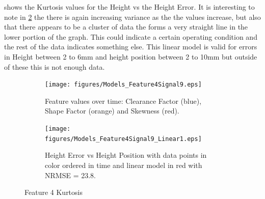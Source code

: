 \documentclass[]{article}
\begin{document}
 shows the Kurtosis values for the Height vs the Height Error. It is interesting to note in \cref{fig:Models_Feature4Signal9_Linear1} the there is again increasing variance as the the values increase, but also that there appears to be a cluster of data the forms a very straight line in the lower portion of the graph. This could indicate a certain operating condition and the rest of the data indicates something else. This linear model is valid for errors in Height between 2 to 6mm and height position between 2 to 10mm but outside of these this is not enough data.
\begin{figure}[H]
    \centering
	\begin{subfigure}[t]{.45\textwidth}
		\centering
		\texttt{[image: figures/Models\_Feature4Signal9.eps]}
		\caption{Feature values over time: Clearance Factor (blue), Shape Factor (orange) and Skewness (red).}
		\label{fig:Models_Feature4Signal9}
	\end{subfigure}
	\hspace*{\fill}%
	\begin{subfigure}[t]{.45\textwidth}
		\centering
		\texttt{[image: figures/Models\_Feature4Signal9\_Linear1.eps]}
		\caption{Height Error vs Height Position with data points in color ordered in time and linear model in red with \gls{NRMSE} = 23.8.}
		\label{fig:Models_Feature4Signal9_Linear1}
	\end{subfigure}
    \caption{Feature 4 Kurtosis}
    \label{fig:Models_Feature4Signal1_Caption}
\end{figure}
\end{document}
